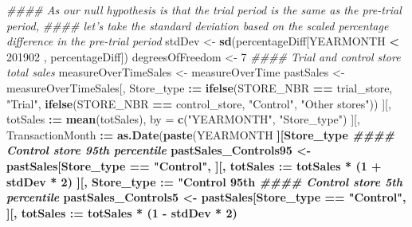 \documentclass[
]{article}
\newenvironment{Shaded}{\begin{snugshade}}{\end{snugshade}}
\newcommand{\CommentTok}[1]{\textcolor[rgb]{0.56,0.35,0.01}{\textit{#1}}}
\newcommand{\DataTypeTok}[1]{\textcolor[rgb]{0.13,0.29,0.53}{#1}}
\newcommand{\DecValTok}[1]{\textcolor[rgb]{0.00,0.00,0.81}{#1}}
\newcommand{\ErrorTok}[1]{\textcolor[rgb]{0.64,0.00,0.00}{\textbf{#1}}}
\newcommand{\KeywordTok}[1]{\textcolor[rgb]{0.13,0.29,0.53}{\textbf{#1}}}
\newcommand{\NormalTok}[1]{#1}
\newcommand{\OperatorTok}[1]{\textcolor[rgb]{0.81,0.36,0.00}{\textbf{#1}}}
\newcommand{\StringTok}[1]{\textcolor[rgb]{0.31,0.60,0.02}{#1}}
\begin{document}
\begin{Shaded}
\begin{Highlighting}[]
\CommentTok{#### As our null hypothesis is that the trial period is the same as the pre-trial period, }
\CommentTok{#### let's take the standard deviation based on the scaled percentage difference in the pre-trial period}
\NormalTok{stdDev <-}\StringTok{ }\KeywordTok{sd}\NormalTok{(percentageDiff[YEARMONTH }\OperatorTok{<}\StringTok{ }\DecValTok{201902}\NormalTok{ , percentageDiff])}
\NormalTok{degreesOfFreedom <-}\StringTok{ }\DecValTok{7}
\CommentTok{#### Trial and control store total sales}
\NormalTok{measureOverTimeSales <-}\StringTok{ }\NormalTok{measureOverTime}
\NormalTok{pastSales <-}\StringTok{ }\NormalTok{measureOverTimeSales[, Store_type }\OperatorTok{:}\ErrorTok{=}\StringTok{ }\KeywordTok{ifelse}\NormalTok{(STORE_NBR }\OperatorTok{==}\StringTok{ }\NormalTok{trial_store, }\StringTok{"Trial"}\NormalTok{,}
\KeywordTok{ifelse}\NormalTok{(STORE_NBR }\OperatorTok{==}\StringTok{ }\NormalTok{control_store, }\StringTok{"Control"}\NormalTok{, }\StringTok{"Other stores"}\NormalTok{))}
\NormalTok{][, totSales }\OperatorTok{:}\ErrorTok{=}\StringTok{ }\KeywordTok{mean}\NormalTok{(totSales), by =}\StringTok{ }\KeywordTok{c}\NormalTok{(}\StringTok{"YEARMONTH"}\NormalTok{, }\StringTok{"Store_type"}\NormalTok{)}
\NormalTok{][, TransactionMonth }\OperatorTok{:}\ErrorTok{=}\StringTok{ }\KeywordTok{as.Date}\NormalTok{(}\KeywordTok{paste}\NormalTok{(YEARMONTH }\OperatorTok{%
\NormalTok{][Store_type }\OperatorTok{%
\CommentTok{#### Control store 95th percentile}
\NormalTok{pastSales_Controls95 <-}\StringTok{ }\NormalTok{pastSales[Store_type }\OperatorTok{==}\StringTok{ "Control"}\NormalTok{,}
\NormalTok{][, totSales }\OperatorTok{:}\ErrorTok{=}\StringTok{ }\NormalTok{totSales }\OperatorTok{*}\StringTok{ }\NormalTok{(}\DecValTok{1} \OperatorTok{+}\StringTok{ }\NormalTok{stdDev }\OperatorTok{*}\StringTok{ }\DecValTok{2}\NormalTok{)}
\NormalTok{][, Store_type }\OperatorTok{:}\ErrorTok{=}\StringTok{ "Control 95th %
\CommentTok{#### Control store 5th percentile}
\NormalTok{pastSales_Controls5 <-}\StringTok{ }\NormalTok{pastSales[Store_type }\OperatorTok{==}\StringTok{ "Control"}\NormalTok{,}
\NormalTok{][, totSales }\OperatorTok{:}\ErrorTok{=}\StringTok{ }\NormalTok{totSales }\OperatorTok{*}\StringTok{ }\NormalTok{(}\DecValTok{1} \OperatorTok{-}\StringTok{ }\NormalTok{stdDev }\OperatorTok{*}\StringTok{ }\DecValTok{2}\NormalTok{)}
}}}
\end{Highlighting}
\end{Shaded}
\end{document}
